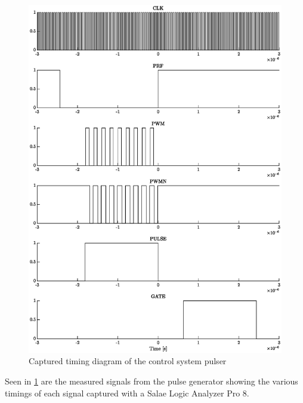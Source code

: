\begin{figure}[htbp]
	\centering
	\includegraphics[width=\linewidth]{Figures/5_controlsystem_fpga_pulser_logic.eps}
	\caption{Captured timing diagram of the control system pulser}
	\label{fig:5_controlsystem_pulser_logic}
\end{figure}
Seen in \cref{fig:5_controlsystem_pulser_logic} are the measured signals from the pulse generator showing the various timings of each signal captured with a Salae Logic Analyzer Pro 8.

